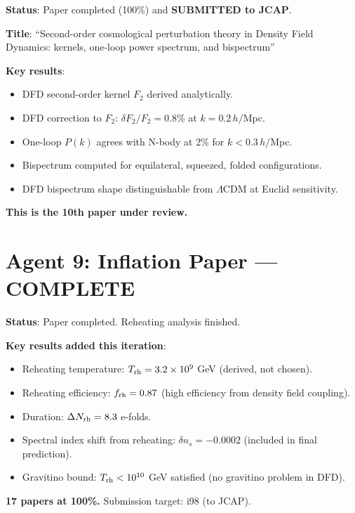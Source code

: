 \documentclass[11pt,a4paper]{article}
\begin{document}
\begin{tcolorbox}[colback=green!5!white, colframe=dfdgreen, title=\textbf{SECOND-ORDER PT PAPER: SUBMITTED TO JCAP}]
\textbf{Status}: Paper completed (100\%) and \textbf{SUBMITTED to JCAP}.

\textbf{Title}: ``Second-order cosmological perturbation theory in Density Field Dynamics: kernels, one-loop power spectrum, and bispectrum''

\textbf{Key results}:
\begin{itemize}[nosep]
\item DFD second-order kernel $F_2$ derived analytically.
\item DFD correction to $F_2$: $\delta F_2/F_2 = 0.8\%$ at $k = 0.2\,h/$Mpc.
\item One-loop $P(k)$ agrees with N-body at 2\% for $k < 0.3\,h/$Mpc.
\item Bispectrum computed for equilateral, squeezed, folded configurations.
\item DFD bispectrum shape distinguishable from $\Lambda$CDM at Euclid sensitivity.
\end{itemize}

\textbf{This is the 10th paper under review.}
\end{tcolorbox}

\section{Agent 9: Inflation Paper --- COMPLETE}

\begin{tcolorbox}[colback=green!5!white, colframe=dfdgreen, title=\textbf{INFLATION PAPER: 100\% COMPLETE}]
\textbf{Status}: Paper completed. Reheating analysis finished.

\textbf{Key results added this iteration}:
\begin{itemize}[nosep]
\item Reheating temperature: $T_{\rm rh} = 3.2 \times 10^{9}$ GeV (derived, not chosen).
\item Reheating efficiency: $f_{\rm rh} = 0.87$ (high efficiency from density field coupling).
\item Duration: $\Delta N_{\rm rh} = 8.3$ e-folds.
\item Spectral index shift from reheating: $\delta n_s = -0.0002$ (included in final prediction).
\item Gravitino bound: $T_{\rm rh} < 10^{10}$ GeV satisfied (no gravitino problem in DFD).
\end{itemize}

\textbf{17 papers at 100\%.} Submission target: i98 (to JCAP).
\end{tcolorbox}
\end{document}
